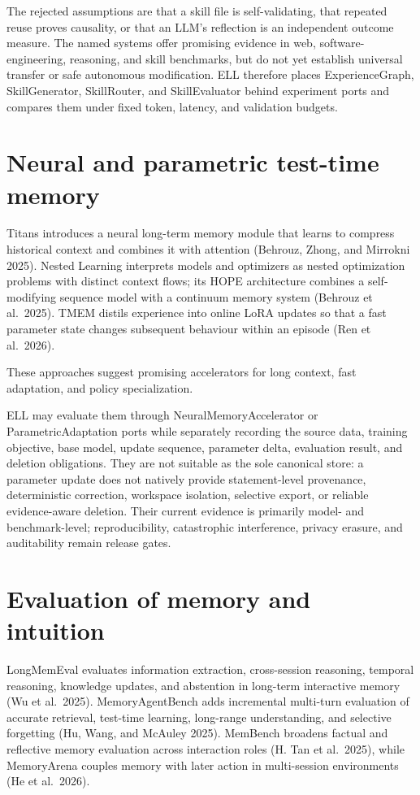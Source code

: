 \documentclass[
  english,
  a4paper,
  DIV=11,
  numbers=noendperiod]{scrreprt}
\begin{document}
The rejected assumptions are that a skill file is self-validating, that
repeated reuse proves causality, or that an LLM's reflection is an
independent outcome measure. The named systems offer promising evidence
in web, software-engineering, reasoning, and skill benchmarks, but do
not yet establish universal transfer or safe autonomous modification.
ELL therefore places ExperienceGraph, SkillGenerator, SkillRouter, and
SkillEvaluator behind experiment ports and compares them under fixed
token, latency, and validation budgets.

\section{Neural and parametric test-time
memory}\label{neural-and-parametric-test-time-memory}

Titans introduces a neural long-term memory module that learns to
compress historical context and combines it with attention (Behrouz,
Zhong, and Mirrokni 2025). Nested Learning interprets models and
optimizers as nested optimization problems with distinct context flows;
its HOPE architecture combines a self-modifying sequence model with a
continuum memory system (Behrouz et al.~2025). TMEM distils experience
into online LoRA updates so that a fast parameter state changes
subsequent behaviour within an episode (Ren et al.~2026).

These approaches suggest promising accelerators for long context, fast
adaptation, and policy specialization.

ELL may evaluate them through NeuralMemoryAccelerator or
ParametricAdaptation ports while separately recording the source data,
training objective, base model, update sequence, parameter delta,
evaluation result, and deletion obligations. They are not suitable as
the sole canonical store: a parameter update does not natively provide
statement-level provenance, deterministic correction, workspace
isolation, selective export, or reliable evidence-aware deletion. Their
current evidence is primarily model- and benchmark-level;
reproducibility, catastrophic interference, privacy erasure, and
auditability remain release gates.

\section{Evaluation of memory and
intuition}\label{evaluation-of-memory-and-intuition}

LongMemEval evaluates information extraction, cross-session reasoning,
temporal reasoning, knowledge updates, and abstention in long-term
interactive memory (Wu et al.~2025). MemoryAgentBench adds incremental
multi-turn evaluation of accurate retrieval, test-time learning,
long-range understanding, and selective forgetting (Hu, Wang, and
McAuley 2025). MemBench broadens factual and reflective memory
evaluation across interaction roles (H. Tan et al.~2025), while
MemoryArena couples memory with later action in multi-session
environments (He et al.~2026).
\end{document}
